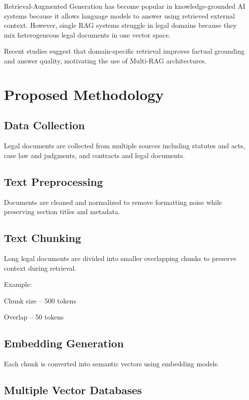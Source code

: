 \documentclass[12pt,a4paper]{article}
\begin{document}
Retrieval-Augmented Generation has become popular in knowledge-grounded AI systems because it allows language models to answer using retrieved external context. However, single RAG systems struggle in legal domains because they mix heterogeneous legal documents in one vector space.

Recent studies suggest that domain-specific retrieval improves factual grounding and answer quality, motivating the use of Multi-RAG architectures.

\section{Proposed Methodology}

\subsection{Data Collection}

Legal documents are collected from multiple sources including statutes and acts, case law and judgments, and contracts and legal documents.

\subsection{Text Preprocessing}

Documents are cleaned and normalized to remove formatting noise while preserving section titles and metadata.

\subsection{Text Chunking}

Long legal documents are divided into smaller overlapping chunks to preserve context during retrieval.

Example:

Chunk size – 500 tokens

Overlap – 50 tokens

\subsection{Embedding Generation}

Each chunk is converted into semantic vectors using embedding models.

\subsection{Multiple Vector Databases}
\end{document}
